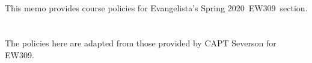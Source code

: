 \documentclass[11pt,courier]{navymemo}
\newcommand{\usnaCourseNumber}{EW309}
\newcommand{\usnaCourseTerm}{Spring 2020}
\begin{document}
\navyrecordnote
\thispagestyle{empty}

%

\navyrecordnotesubjline

\section{}  This memo provides course policies for Evangelista's \usnaCourseTerm\ \usnaCourseNumber\ section.

\section{}  The policies here are adapted from those provided by CAPT Severson for EW309.

\end{document}
